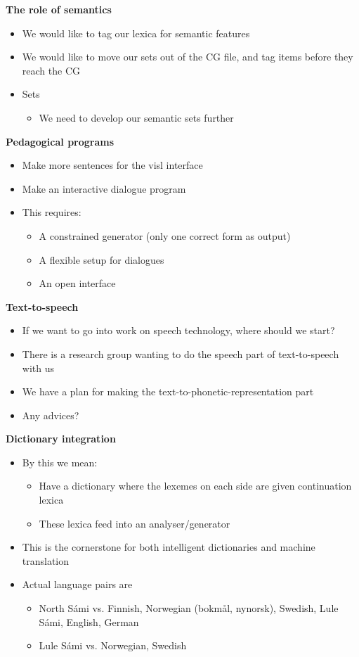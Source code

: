 \documentclass[landscape,english,11pt]{seminar}
\begin{document}
\begin{slide}
\begin{itemize}
\newslide
\textbf{The role of semantics}
\begin{itemize}
 \item We would like to tag our lexica for semantic features
 \item We would like to move our sets out of the CG file, and tag items before they reach the CG
 \item Sets
  \begin{itemize}
  \item We need to develop our semantic sets further
  \end{itemize}
\end{itemize}


\newslide
\textbf{Pedagogical programs}
\begin{itemize}
\item Make more sentences for the visl interface
\item Make an interactive dialogue program
\item This requires:
\begin{itemize}
\item A constrained generator (only one correct form as output)
\item A flexible setup for dialogues
\item An open interface
\end{itemize}
\end{itemize}


\newslide
\textbf{Text-to-speech}
\begin{itemize}
\item If we want to go into work on speech technology, where should we start?
\item There is a research group wanting to do the speech part of text-to-speech with us
\item We have a plan for making the text-to-phonetic-representation part
\item Any advices?
\end{itemize}

\newslide
\textbf{Dictionary integration}
\begin{itemize}
\item By this we mean:
\begin{itemize}
\item Have a dictionary where the lexemes on each side are given continuation lexica
\item These lexica feed into an analyser/generator
\end{itemize}
\item This is the cornerstone for both intelligent dictionaries and machine translation
\item Actual language pairs are
\begin{itemize}
\item North Sámi vs. Finnish, Norwegian (bokmål, nynorsk), Swedish, Lule Sámi, English, German
\item Lule Sámi vs. Norwegian, Swedish
\end{itemize}


\end{itemize}
\end{itemize}
\end{slide}
\end{document}
